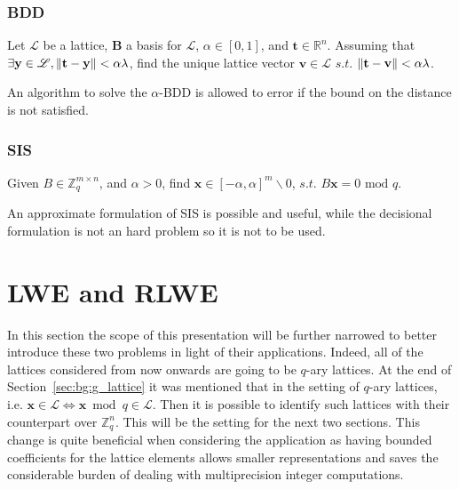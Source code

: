 \subsubsection{BDD}

\begin{definition}
Let $\mathscr{L}$ be a lattice, $\mathbf{B}$ a basis for $\mathscr{L}$, $\alpha\in[0,1]$, and $\mathbf{t}\in\mathbb{R}^n$. Assuming that $\exists \mathbf{y}\in\mathscr{L},\left\lVert \mathbf{t}-\mathbf{y} \right\rVert < \alpha\lambda$, find the unique lattice vector $\mathbf{v}\in\mathscr{L}$ $s.t.$ $\left\lVert \mathbf{t}-\mathbf{v} \right\rVert<\alpha\lambda$.
\end{definition}

\begin{remark}
An algorithm to solve the $\alpha$-BDD is allowed to error if the bound on the distance is not satisfied.
\end{remark}

\subsubsection{SIS}

\begin{definition}
Given $B\in\mathbb{Z}_q^{m\times n}$, and $\alpha > 0$, find $\mathbf{x}\in[-\alpha,\alpha]^m\backslash{0}$, $s.t.$ $B\mathbf{x}=0$ $\mathrm{mod}$ $q$.
\end{definition}

\begin{remark}
An approximate formulation of SIS is possible and useful, while the decisional formulation is not an hard problem so it is not to be used.
\end{remark}

\section{LWE and RLWE}
In this section the scope of this presentation will be further narrowed to better introduce these two problems in light of their applications. Indeed, all of the lattices considered from now onwards are going to be $q$-ary lattices. At the end of \mbox{Section \ref{sec:bg:g_lattice}} it was mentioned that in the setting of $q$-ary lattices, i.e. \mbox{$\mathbf{x}\in\mathscr{L}\Leftrightarrow\mathbf{x}$ $\mathrm{mod}$ $q\in\mathscr{L}$}. Then it is possible to identify such lattices with their counterpart over $\mathbb{Z}_q^n$. This will be the setting for the next two sections. This change is quite beneficial when considering the application as having bounded coefficients for the lattice elements allows smaller representations and saves the considerable burden of dealing with  multiprecision integer computations. \\

